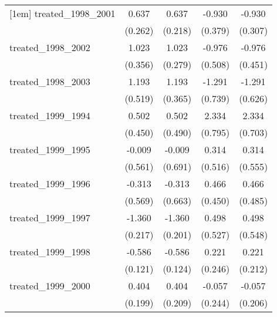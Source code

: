 {\begin{tabular}{l*{4}{c}}
[1em]
treated\_1998\_2001&       0.637\sym{*}  &       0.637\sym{**} &      -0.930\sym{*}  &      -0.930\sym{**} \\
            &     (0.262)         &     (0.218)         &     (0.379)         &     (0.307)         \\
[1em]
treated\_1998\_2002&       1.023\sym{**} &       1.023\sym{***}&      -0.976         &      -0.976\sym{*}  \\
            &     (0.356)         &     (0.279)         &     (0.508)         &     (0.451)         \\
[1em]
treated\_1998\_2003&       1.193\sym{*}  &       1.193\sym{**} &      -1.291         &      -1.291\sym{*}  \\
            &     (0.519)         &     (0.365)         &     (0.739)         &     (0.626)         \\
[1em]
treated\_1999\_1994&       0.502         &       0.502         &       2.334\sym{**} &       2.334\sym{***}\\
            &     (0.450)         &     (0.490)         &     (0.795)         &     (0.703)         \\
[1em]
treated\_1999\_1995&      -0.009         &      -0.009         &       0.314         &       0.314         \\
            &     (0.561)         &     (0.691)         &     (0.516)         &     (0.555)         \\
[1em]
treated\_1999\_1996&      -0.313         &      -0.313         &       0.466         &       0.466         \\
            &     (0.569)         &     (0.663)         &     (0.450)         &     (0.485)         \\
[1em]
treated\_1999\_1997&      -1.360\sym{***}&      -1.360\sym{***}&       0.498         &       0.498         \\
            &     (0.217)         &     (0.201)         &     (0.527)         &     (0.548)         \\
[1em]
treated\_1999\_1998&      -0.586\sym{***}&      -0.586\sym{***}&       0.221         &       0.221         \\
            &     (0.121)         &     (0.124)         &     (0.246)         &     (0.212)         \\
[1em]
treated\_1999\_2000&       0.404\sym{*}  &       0.404         &      -0.057         &      -0.057         \\
            &     (0.199)         &     (0.209)         &     (0.244)         &     (0.206)         \\

\end{tabular}}
